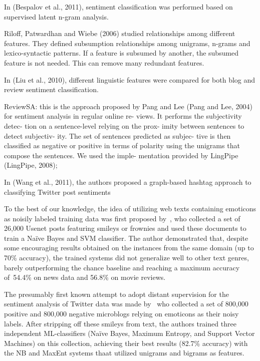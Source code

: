 
In (Bespalov et al., 2011), sentiment classification was performed
based on supervised latent n-gram analysis.



Riloff, Patwardhan and Wiebe (2006) studied relationships among
different features. They defined subsumption relationships among
unigrams, n-grams and lexico-syntactic patterns. If a feature is
subsumed by another, the subsumed feature is not needed. This can
remove many redundant features.

In (Liu et al., 2010), different linguistic features were compared for
both blog and review sentiment classification.


ReviewSA: this is the approach proposed by Pang and Lee (Pang and Lee,
2004) for sentiment analysis in regular online re- views. It performs
the subjectivity detec- tion on a sentence-level relying on the prox-
imity between sentences to detect subjectiv- ity. The set of sentences
predicted as subjec- tive is then classified as negative or positive
in terms of polarity using the unigrams that compose the sentences. We
used the imple- mentation provided by LingPipe (LingPipe, 2008);



\todo[inline]{}


In (Wang et al., 2011), the authors
proposed a graph-based hashtag approach to classifying Twitter post
sentiments

\todo[inline]{}

To the best of our knowledge, the idea of utilizing web texts
containing emoticons as noisily labeled training data was first
proposed by~\citet{Read:05}, who collected a set of 26,000 Usenet
posts featuring smileys or frownies and used these documents to train
a Na{\"i}ve Bayes and SVM classifier.  The author demonstrated that,
despite some encouraging results obtained on the instances from the
same domain (up to 70\% accuracy), the trained systems did not
generalize well to other text genres, barely outperforming the chance
baseline and reaching a maximum accuracy of~54.4\% on news data and
56.8\% on movie reviews.

The presumably first known attempt to adopt distant supervision for
the sentiment analysis of Twitter data was made by~\citet{Go:09} who
collected a set of 800,000 positive and 800,000 negative microblogs
relying on emoticons as their noisy labels.  After stripping off these
smileys from text, the authors trained three independent
ML-classifiers (Na{\"i}ve Bayes, Maximum Entropy, and Support Vector
Machines) on this collection, achieving their best results (82.7\%
accuracy) with the NB and MaxEnt systems thaat utilized unigrams and
bigrams as features.


